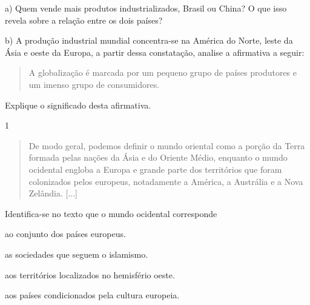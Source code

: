 
\num{a)} Quem vende mais produtos industrializados, Brasil ou China? O que
isso revela sobre a relação entre os dois países?



\num{b)} A produção industrial mundial concentra-se na América do Norte, leste
da Ásia e oeste da Europa, a partir dessa constatação, analise a
afirmativa a seguir:

\begin{quote}
A globalização é marcada por um pequeno grupo de países produtores e um
imenso grupo de consumidores.
\end{quote}

Explique o significado desta afirmativa.




\num{1} 

\begin{quote}
De modo geral, podemos definir o mundo oriental como a porção
da Terra formada pelas nações da Ásia e do Oriente Médio, enquanto o
mundo ocidental engloba a Europa e grande parte dos territórios que
foram colonizados pelos europeus, notadamente a América, a Austrália e a
Nova Zelândia. {[}...{]}

\end{quote}

Identifica-se no texto que o mundo ocidental corresponde

\begin{escolha}
\item
  ao conjunto dos países europeus.
\item
  as sociedades que seguem o islamismo.
\item
  aos territórios localizados no hemisfério oeste.
\item
  aos países condicionados pela cultura europeia.
\end{escolha}

